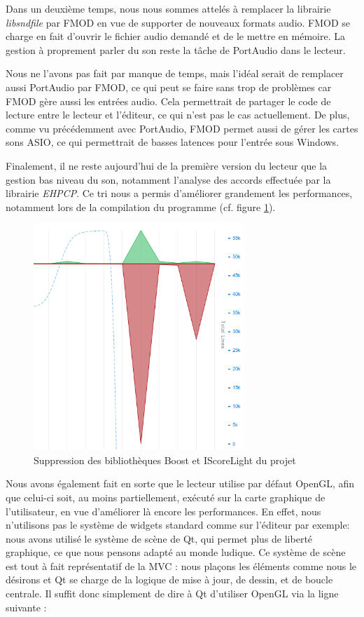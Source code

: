 Dans un deuxième temps, nous nous sommes attelés à remplacer la librairie \textit{libsndfile} par FMOD en vue de supporter de nouveaux formats audio. FMOD se charge en fait d'ouvrir le fichier audio demandé et de le mettre en mémoire. La gestion à proprement parler du son reste la tâche de PortAudio dans le lecteur.

Nous ne l'avons pas fait par manque de temps, mais l'idéal serait de remplacer aussi PortAudio par FMOD,
 ce qui peut se faire sans trop de problèmes car FMOD gère aussi les entrées audio.
 Cela permettrait de partager le code de lecture entre le lecteur et l'éditeur, ce qui n'est pas le cas actuellement.
 De plus, comme vu précédemment avec PortAudio, FMOD permet aussi de gérer les cartes sons ASIO, ce qui permettrait de basses
 latences pour l'entrée sous Windows.

Finalement, il ne reste aujourd'hui de la première version du lecteur que la gestion bas niveau du son, notamment l'analyse des accords effectuée par la librairie \textit{EHPCP}. Ce tri nous a permis d'améliorer grandement les performances, notamment lors de la compilation du programme (cf. figure \ref{refonte_code}).

\begin{figure}[H]
\begin{center}
\includegraphics[width=300px]{refonte_code.png}
\caption{Suppression des bibliothèques Boost et IScoreLight du projet}
\label{refonte_code}
\end{center}
\end{figure}

Nous avons également fait en sorte que le lecteur utilise par défaut OpenGL, afin que celui-ci soit, au moins partiellement, exécuté sur la carte graphique de l'utilisateur, en vue d'améliorer là encore les performances. En effet, nous n'utilisons pas le système de widgets standard comme sur l'éditeur par exemple: nous avons utilisé le système de scène de Qt, qui permet plus de liberté graphique, ce que nous pensons adapté au monde ludique.
Ce système de scène est tout à fait représentatif de la \ac{MVC} : nous plaçons les éléments comme nous le désirons et Qt se charge
de la logique de mise à jour, de dessin, et de boucle centrale. Il suffit donc simplement de dire à Qt d'utiliser OpenGL via la ligne suivante :

